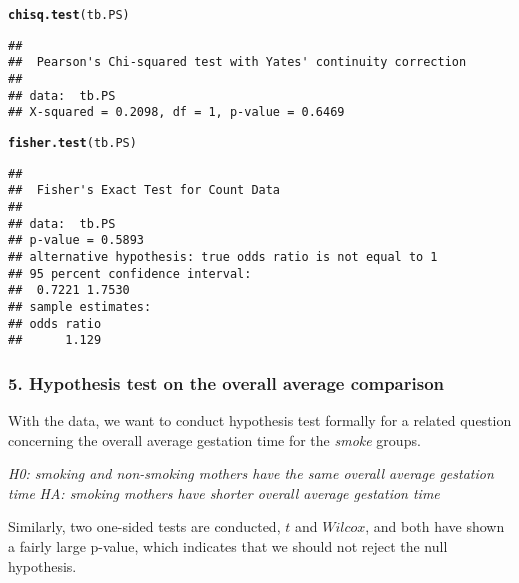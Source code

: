\documentclass{article}\usepackage{graphicx, color}
\makeatletter
\newcommand{\hlfunctioncall}[1]{\textcolor[rgb]{0.501960784313725,0,0.329411764705882}{\textbf{#1}}}%
\newenvironment{kframe}{%
 \def\at@end@of@kframe{}%
 \ifinner\ifhmode%
  \def\at@end@of@kframe{\end{minipage}}%
  \begin{minipage}{\columnwidth}%
 \fi\fi%
 \def\FrameCommand##1{\hskip\@totalleftmargin \hskip-\fboxsep
 \colorbox{shadecolor}{##1}\hskip-\fboxsep
     \hskip-\linewidth \hskip-\@totalleftmargin \hskip\columnwidth}%
 \MakeFramed {\advance\hsize-\width
   \@totalleftmargin\z@ \linewidth\hsize
   \@setminipage}}%
 {\par\unskip\endMakeFramed%
 \at@end@of@kframe}
\newenvironment{knitrout}{}{} %
\makeatother
\begin{document}
\begin{knitrout}
\color{fgcolor}\begin{kframe}
\begin{alltt}
\hlfunctioncall{chisq.test}(tb.PS)
\end{alltt}
\begin{verbatim}
## 
## 	Pearson's Chi-squared test with Yates' continuity correction
## 
## data:  tb.PS 
## X-squared = 0.2098, df = 1, p-value = 0.6469
\end{verbatim}
\newpage
\begin{alltt}
\hlfunctioncall{fisher.test}(tb.PS)
\end{alltt}
\begin{verbatim}
## 
## 	Fisher's Exact Test for Count Data
## 
## data:  tb.PS 
## p-value = 0.5893
## alternative hypothesis: true odds ratio is not equal to 1 
## 95 percent confidence interval:
##  0.7221 1.7530 
## sample estimates:
## odds ratio 
##      1.129
\end{verbatim}
\end{kframe}
\end{knitrout}


\subsubsection*{5. Hypothesis test on the overall average comparison}
\hspace{12 pt} With the data, we want to conduct
hypothesis test formally for a related question concerning the overall
average gestation time for the \textit{smoke} groups. \newline


\hspace{12 pt} \textit{H0: smoking and non-smoking mothers have the same overall average gestation time} \newline
\vspace{2 pt}
\hspace{24 pt} \textit{HA: smoking mothers have shorter overall average gestation time} \newline


Similarly, two one-sided tests are conducted, $t$ and $Wilcox$, and both have shown a
fairly large p-value, which indicates that we should not reject the
null hypothesis.
\end{document}
